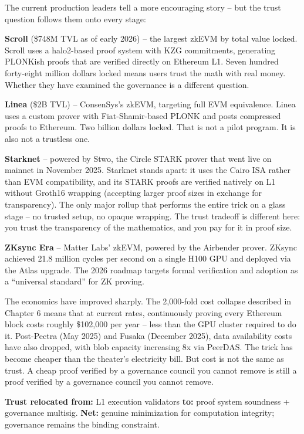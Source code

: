 \documentclass[
  11pt,
  openany]{report}
\renewcommand{\textbf}[1]{{\bfseries\color{MidnightBold}#1}}
\begin{document}
The current production leaders tell a more encouraging story -- but the trust
question follows them onto every stage:

\textbf{Scroll} (\$748M TVL as of early 2026) -- the largest zkEVM by total
value locked. Scroll uses a halo2-based proof system with KZG commitments,
generating PLONKish proofs that are verified directly on Ethereum L1. Seven
hundred forty-eight million dollars locked means users trust the math with real
money. Whether they have examined the governance is a different question.

\textbf{Linea} (\$2B TVL) -- ConsenSys's zkEVM, targeting full EVM equivalence.
Linea uses a custom prover with Fiat-Shamir-based PLONK and posts compressed
proofs to Ethereum. Two billion dollars locked. That is not a pilot program. It
is also not a trustless one.

\textbf{Starknet} -- powered by Stwo, the Circle STARK prover that went live on
mainnet in November 2025. Starknet stands apart: it uses the Cairo ISA rather
than EVM compatibility, and its STARK proofs are verified natively on L1 without
Groth16 wrapping (accepting larger proof sizes in exchange for transparency).
The only major rollup that performs the entire trick on a glass stage -- no
trusted setup, no opaque wrapping. The trust tradeoff is different here: you
trust the transparency of the mathematics, and you pay for it in proof size.

\textbf{ZKsync Era} -- Matter Labs' zkEVM, powered by the Airbender prover.
ZKsync achieved 21.8 million cycles per second on a single H100 GPU and deployed
via the Atlas upgrade. The 2026 roadmap targets formal verification and adoption
as a ``universal standard'' for ZK proving.

The economics have improved sharply. The 2,000-fold cost collapse described in
Chapter 6 means that at current rates, continuously proving every Ethereum block
costs roughly \$102,000 per year -- less than the GPU cluster required to do it.
Post-Pectra (May 2025) and Fusaka (December 2025), data availability costs have
also dropped, with blob capacity increasing 8x via PeerDAS. The trick has become
cheaper than the theater's electricity bill. But cost is not the same as trust.
A cheap proof verified by a governance council you cannot remove is still a
proof verified by a governance council you cannot remove.

\textbf{Trust relocated from:} L1 execution validators \textbf{to:} proof system
soundness + governance multisig. \textbf{Net:} genuine minimization for
computation integrity; governance remains the binding constraint.
\end{document}
